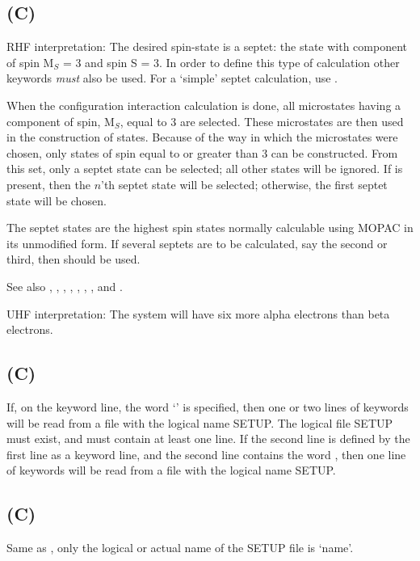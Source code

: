 \subsection*{ (C)}
        RHF interpretation:  The desired spin-state is a septet:  the  state
   with component of spin M$_S$ = 3 and spin S = 3.
In order to define this type of calculation
other keywords {\em must} also be used.  For a `simple' septet  calculation,
use .


 When the configuration interaction calculation is done, all microstates having
a component of spin,  M$_S$, equal to 3 are selected.  These microstates are then
used in the construction of states.  Because of the way in which the microstates
were chosen, only states of spin equal to or greater than 3 can be constructed.
From this set, only a septet  state can be selected; all other states will be ignored.
If  is present, then the $n$'th septet  state will be selected;
otherwise, the first septet  state will be  chosen.

        The septet states are the highest spin  states  normally  calculable
   using MOPAC in its unmodified form.
     If several septets are to be calculated, say the second
   or third, then  should be used.

See also , , , , ,
, ,  and .

        UHF interpretation:  The system will have six  more alpha  electrons
   than beta electrons.

\subsection*{ (C)}
        If, on the keyword line, the word `' is specified, then one  or
   two  lines  of  keywords  will  be read from a file with the logical name
   SETUP.  The logical file SETUP must exist, and must contain at least  one
   line.  If the second line is defined by the first line as a keyword line,
   and the second line contains the word , then one  line  of  keywords
   will be read from a file with the logical name SETUP.


\subsection*{ (C)}
           Same as , only the logical or actual name of the SETUP file  is
   `name'.



